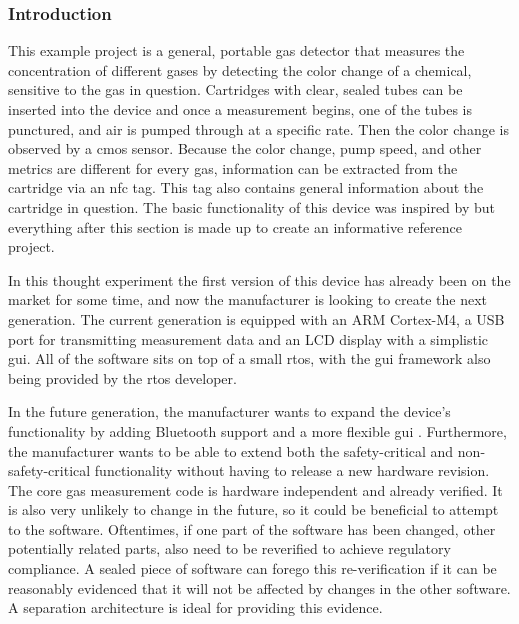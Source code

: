 \subsubsection{Introduction}
This example project is a general, portable gas detector that measures the concentration of different gases by detecting the color change of a chemical, sensitive to the gas in question. Cartridges with clear, sealed tubes can be inserted into the device and once a measurement begins, one of the tubes is punctured, and air is pumped through at a specific rate. Then the color change is observed by a \acrshort{cmos} sensor. Because the color change, pump speed, and other metrics are different for every gas, information can be extracted from the cartridge via an \acrshort{nfc} tag. This tag also contains general information about the cartridge in question. The basic functionality of this device was inspired by \cite{gasdetect} but everything after this section is made up to create an informative reference project.

In this thought experiment the first version of this device has already been on the market for some time, and now the manufacturer is looking to create the next generation. The current generation is equipped with an ARM Cortex-M4, a USB port for transmitting measurement data and an LCD display with a simplistic \acrshort{gui}. All of the software sits on top of a small \acrshort{rtos}, with the \acrshort{gui} framework also being provided by the \acrshort{rtos} developer.

In the future generation, the manufacturer wants to expand the device's functionality by adding Bluetooth support and a more flexible \acrshort{gui} . Furthermore, the manufacturer wants to be able to extend both the safety-critical and non-safety-critical functionality without having to release a new hardware revision. The core gas measurement code is hardware independent and already verified. It is also very unlikely to change in the future, so it could be beneficial to attempt to  the software. Oftentimes, if one part of the software has been changed, other potentially related parts, also need to be reverified to achieve regulatory compliance. A sealed piece of software can forego this re-verification if it can be reasonably evidenced that it will not be affected by changes in the other software. A separation architecture is ideal for providing this evidence.
